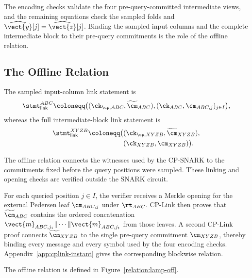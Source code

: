 The encoding checks validate the four pre-query-committed intermediate views,
and the remaining
equations check the sampled folds and \(\widehat{\vect{y}}[j]=
\widehat{\vect{z}}[j]\).  Binding the sampled input columns and the complete
intermediate block to their pre-query commitments is the role of the offline
relation.

\subsection{The Offline Relation}
\label{sec:openings-and-cplink}

The sampled input-column link statement is
\[
  \stmt_{\mathsf{link}}^{ABC}
  \coloneqq
  \big(
    (\ck_{\cp,ABC},\widetilde{\cm}_{ABC}),
    (\ck_{ABC},\cm_{ABC,j})_{j\in I}
  \big),
\]
whereas the full intermediate-block link statement is
\[
  \begin{aligned}
  \stmt_{\mathsf{link}}^{XYZB}
  \coloneqq \big(&
    (\ck_{\cp,XYZB},\widetilde{\cm}_{XYZB}),\\[-0.2ex]
    &(\ck_{XYZB},\cm_{XYZB})
  \big).
  \end{aligned}
\]

The offline relation connects the witnesses used by the CP-SNARK to the
commitments fixed before the query positions were sampled.  These linking and
opening checks are verified outside the SNARK circuit.

For each queried position \(j\in I\), the verifier receives a Merkle opening
for the external Pedersen leaf \(\cm_{ABC,j}\) under \(\rt_{ABC}\).  CP-Link
then proves that \(\widetilde{\cm}_{ABC}\) contains the ordered concatenation
\(\vect{m}_{ABC,j_1}\|\cdots\|\vect{m}_{ABC,j_t}\) from those leaves.  A
second CP-Link proof connects \(\widetilde{\cm}_{XYZB}\) to the single
pre-query commitment \(\cm_{XYZB}\), thereby binding every message and every
symbol used by the four encoding checks.  Appendix~\ref{app:cplink-instant}
gives the corresponding blockwise relation.


The offline relation is defined in Figure~\ref{relation:lamp-off}.

